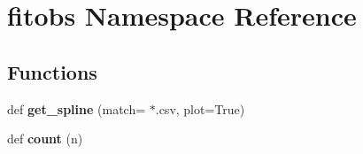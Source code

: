 \hypertarget{namespacefitobs}{}\section{fitobs Namespace Reference}
\label{namespacefitobs}
\subsection*{Functions}
\begin{DoxyCompactItemize}
\item 
\mbox{\label{namespacefitobs_a8e260a0259bda79eaeac386cdfeab55b}} 
def {\bfseries get\+\_\+spline} (match=\textquotesingle{} $\ast$.csv\textquotesingle{}, plot=True)
\item 
\mbox{\label{namespacefitobs_a872d89d27c23d650bc14f48c887e9049}} 
def {\bfseries count} (n)
\end{DoxyCompactItemize}
